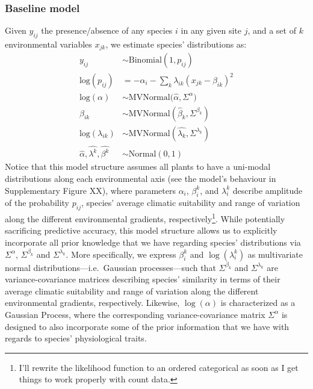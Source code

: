 \documentclass[11pt, a4paper]{article}
\begin{document}
\subsubsection*{Baseline model}
Given $y_{ij}$ the presence/absence of any species $i$ in any given site $j$, and a set of $k$ environmental variables $x_{jk}$, we estimate species' distributions as:
\begin{equation} 
\begin{split}
y_{ij} & \sim \text{Binomial}\left(1, p_{ij}\right)\\
\text{log}\left(p_{ij}\right) & = -\alpha_{i} - \sum_{k} \lambda_{ik} \left(x_{jk}-\beta_{ik}\right)^2\\
\text{log}(\alpha)  & \sim \text{MVNormal}\Big(\hat{\alpha}, \Sigma^{\alpha}\Big)\\
\beta_{ik}  & \sim \text{MVNormal}\left(\hat{\beta}_{k}, \Sigma^{\beta_{k}}\right)\\
\text{log}(\lambda_{ik})  & \sim \text{MVNormal}\left(\hat{\lambda_{k}}, \Sigma^{\lambda_{k}}\right)\\
\hat{\alpha}, 
\hat{\lambda^{k}}, 
\hat{\beta^{k}}  & \sim \text{Normal}\left(0,1\right)
\end{split}
\label{eq:baseline}
\end{equation}
Notice that this model structure assumes all plants to have a uni-modal distributions along each environmental axis (see the model's behaviour in Supplementary Figure XX), where parameters $\alpha_i$, $\beta_i^k$, and $\lambda_i^k$ describe amplitude of the probability $p_{ij}$, species' average climatic suitability and range of variation along the different environmental gradients, respectively\footnote[2]{I'll rewrite the likelihood function to an ordered categorical as soon as I get things to work properly with count data.}. While potentially sacrificing predictive accuracy, this model structure allows us to explicitly incorporate all prior knowledge that we have regarding species' distributions via $\Sigma^{\alpha}$, $\Sigma^{\beta_{k}}$ and $\Sigma^{\lambda_{k}}$. More specifically, we express $\beta_i^k$ and $\log\left(\lambda_i^k\right)$ as multivariate normal distributions---i.e.~Gaussian processes---such that $\Sigma^{\beta_{k}}$ and $\Sigma^{\lambda_{k}}$ are variance-covariance matrices describing species' similarity in terms of their average climatic suitability and range of variation along the different environmental gradients, respectively. Likewise, $\log\left(\alpha\right)$ is characterized as a Gaussian Process, where the corresponding variance-covariance matrix $\Sigma^{\alpha}$ is designed to also incorporate some of the prior information that we have with regards to species' physiological traits.
\end{document}
